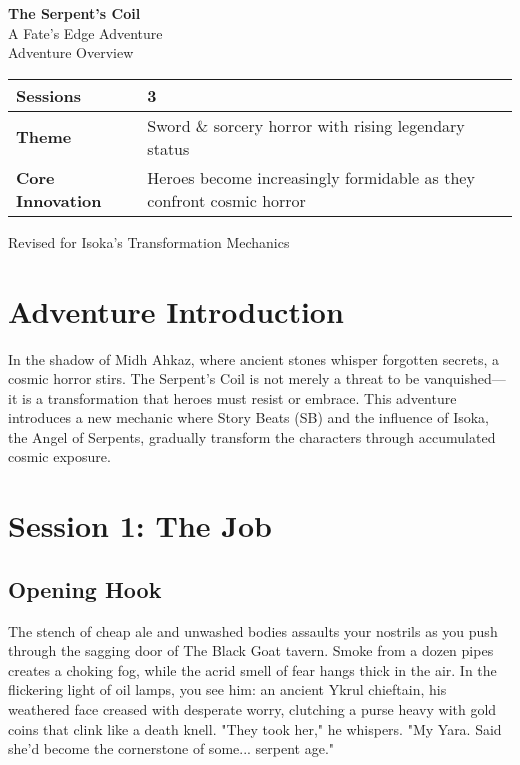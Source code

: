 \documentclass[11pt]{article}
\begin{document}
\begin{titlepage}
\centering
\vspace*{2cm}
{\Huge\bfseries\color{serpentgreen} The Serpent's Coil} \\
\vspace{0.5cm}
{\Large A Fate's Edge Adventure} \\
\vspace{2cm}
{\Large Adventure Overview} \\
\vspace{1cm}
\begin{tabular}{|p{5cm}|p{8cm}|}
\hline
\textbf{Sessions} & 3 \\
\hline
\textbf{Theme} & Sword \& sorcery horror with rising legendary status \\
\hline
\textbf{Core Innovation} & Heroes become increasingly formidable as they confront cosmic horror \\
\hline
\end{tabular}
\vfill
{\large\color{copper} Revised for Isoka's Transformation Mechanics}
\end{titlepage}

\newpage

\section*{Adventure Introduction}

In the shadow of Midh Ahkaz, where ancient stones whisper forgotten secrets, a cosmic horror stirs. The Serpent's Coil is not merely a threat to be vanquished—it is a transformation that heroes must resist or embrace. This adventure introduces a new mechanic where Story Beats (SB) and the influence of Isoka, the Angel of Serpents, gradually transform the characters through accumulated cosmic exposure.

\section{Session 1: The Job}

\subsection{Opening Hook}

The stench of cheap ale and unwashed bodies assaults your nostrils as you push through the sagging door of The Black Goat tavern. Smoke from a dozen pipes creates a choking fog, while the acrid smell of fear hangs thick in the air. In the flickering light of oil lamps, you see him: an ancient Ykrul chieftain, his weathered face creased with desperate worry, clutching a purse heavy with gold coins that clink like a death knell. "They took her," he whispers. "My Yara. Said she'd become the cornerstone of some... serpent age."
\end{document}
